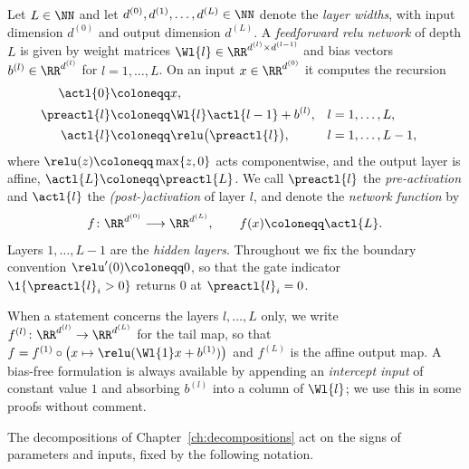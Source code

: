 \begin{definition}\label{def:ffn_relu}
Let $L \in \NN$ and let $d^{(0)}, d^{(1)}, \ldots, d^{(L)} \in \NN$ denote the \emph{layer widths}, with input dimension $d^{(0)}$ and output dimension $d^{(L)}$. A \emph{feedforward \ac{relu} network} of depth $L$ is given by weight matrices $\Wl{l} \in \RR^{d^{(l)} \times d^{(l-1)}}$ and bias vectors $b^{(l)} \in \RR^{d^{(l)}}$ for $l = 1, \ldots, L$. On an input $x \in \RR^{d^{(0)}}$ it computes the recursion
\begin{align}
	\actl{0} &\coloneqq x, \notag\\
	\preactl{l} &\coloneqq \Wl{l} \actl{l-1} + b^{(l)}, && l = 1, \ldots, L, \label{eq:forward_recursion}\\
	\actl{l} &\coloneqq \relu\bigl(\preactl{l}\bigr), && l = 1, \ldots, L-1, \notag
\end{align}
where $\relu(z) \coloneqq \max\{z, 0\}$ acts componentwise, and the output layer is affine, $\actl{L} \coloneqq \preactl{L}$. We call $\preactl{l}$ the \emph{pre-activation} and $\actl{l}$ the \emph{(post-)activation} of layer $l$, and denote the \emph{network function} by
\begin{equation}
	f \colon \RR^{d^{(0)}} \longrightarrow \RR^{d^{(L)}},
	\qquad
	f(x) \coloneqq \actl{L}.
	\label{eq:network_function}
\end{equation}
Layers $1, \ldots, L-1$ are the \emph{hidden layers}. Throughout we fix the boundary convention $\relu'(0) \coloneqq 0$, so that the gate indicator $\1\{\preactl{l}_i > 0\}$ returns $0$ at $\preactl{l}_i = 0$.
\end{definition}

When a statement concerns the layers $l, \ldots, L$ only, we write $f^{(l)} \colon \RR^{d^{(l)}} \to \RR^{d^{(L)}}$ for the tail map, so that $f = f^{(1)} \circ \bigl(x \mapsto \relu(\Wl{1} x + b^{(1)})\bigr)$ and $f^{(L)}$ is the affine output map. A bias-free formulation is always available by appending an \emph{intercept input} of constant value $1$ and absorbing $b^{(l)}$ into a column of $\Wl{l}$; we use this in some proofs without comment.

The decompositions of Chapter~\ref{ch:decompositions} act on the signs of parameters and inputs, fixed by the following notation.

